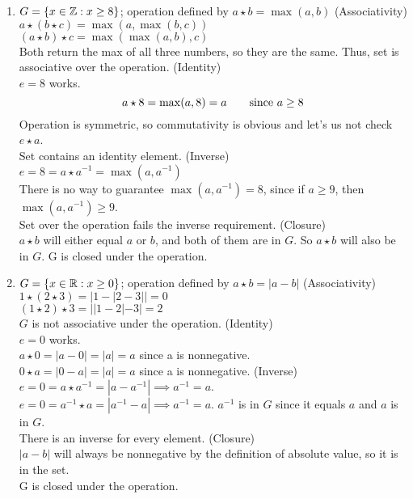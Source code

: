 \documentclass[12pt]{article}
\begin{document}
\begin{enumerate}
		\item $G = \{x\in\mathbb{Z} : x \geq 8\}$; operation defined by $a \star b = \max(a,b)$\m
		(Associativity)\\
		$a \star (b \star c) = \max(a,\max(b,c))$\\
		$(a \star b) \star c = \max(\max(a,b),c)$\\
		Both return the max of all three numbers, so they are the same. Thus, set is associative over the operation.\m
		(Identity)\\
		$e = 8$ works.\\
		\[a \star 8 = \max(a,8) = a \text{\qquad since $a\geq8$}\]
		Operation is symmetric, so commutativity is obvious and let's us not check $e \star a$.\\
		Set contains an identity element.\m
		(Inverse)\\
		$e = 8 = a \star a^{-1} = \max(a,a^{-1})$\\
		There is no way to guarantee $\max(a,a^{-1}) = 8$, since if $a \geq 9$, then $\max(a,a^{-1}) \geq 9$.\\
		Set over the operation fails the inverse requirement.\m
		(Closure)\\
		$a \star b$ will either equal $a$ or $b$, and both of them are in $G$. So $a \star b$ will also be in $G$.
		G is closed under the operation.\bigskip

		\item $G = \{x\in\mathbb{R} : x\geq 0\}$; operation defined by $a \star b = |a-b|$\m
		(Associativity)\\
		$1 \star (2 \star 3) = |1-|2-3|| = 0$\\
		$(1 \star 2) \star 3 = ||1-2|-3| = 2$\\
		$G$ is not associative under the operation.\m
		(Identity)\\
		$e = 0$ works.\\
		$a \star 0 = |a-0| = |a| = a$ since a is nonnegative.\\
		$0 \star a = |0-a| = |a| = a$ since a is nonnegative.\m
		(Inverse)\\
		$e = 0 = a \star a^{-1} = |a-a^{-1}| \implies a^{-1} = a$.\\
		$e = 0 = a^{-1} \star a = |a^{-1}-a| \implies a^{-1} = a$. $a^{-1}$ is in $G$ since it equals $a$ and $a$ is in $G$.\\
		There is an inverse for every element.\m
		(Closure)\\
		$|a-b|$ will always be nonnegative by the definition of absolute value, so it is in the set.\\
		G is closed under the operation.\bigskip
		

\end{enumerate}
\end{document}
